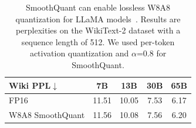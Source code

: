 \begin{table}
\setlength{\tabcolsep}{8pt}
\small
\centering
\caption{SmoothQuant can enable lossless W8A8 quantization for LLaMA models~\cite{touvron2023llama}. Results are perplexities on the WikiText-2 dataset with a sequence length of 512. We used per-token activation quantization and $\alpha$=0.8 for SmoothQuant. 
}
\label{tab:llama}
\begin{tabular}{lcccc}
\toprule
Wiki PPL$\downarrow$  & 7B & 13B & 30B & 65B  \\
\midrule
FP16  & 11.51 & 10.05 & 7.53 & 6.17    \\
W8A8 SmoothQuant & 11.56 & 10.08 & 7.56 & 6.20\\
\bottomrule
\end{tabular}
\end{table}
